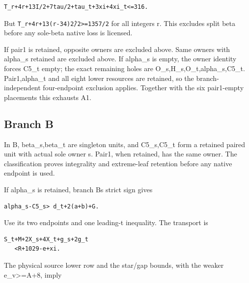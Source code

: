 \documentclass[10pt,a4paper]{article}
\theoremstyle{definition}
\begin{document}
\begin{lstlisting}
T_r+4r+13I/2+7tau/2+tau_t+3xi+4xi_t<=316.
\end{lstlisting}

But \texttt{T\_\allowbreak{}\allowbreak{}r+\allowbreak{}4r+\allowbreak{}13(r-34)\^2/\allowbreak{}2>=\allowbreak{}1357/\allowbreak{}2} for all
integers r. This excludes split beta before any sole-beta native loss is
licensed.

If pair1 is retained,\allowbreak{} opposite owners are excluded above. Same owners
with alpha\_\allowbreak{}s retained are excluded above. If alpha\_\allowbreak{}s is empty,\allowbreak{} the
owner identity forces C5\_\allowbreak{}t empty; the exact remaining holes are
O\_\allowbreak{}s,\allowbreak{}H\_\allowbreak{}s,\allowbreak{}O\_\allowbreak{}t,\allowbreak{}alpha\_\allowbreak{}s,\allowbreak{}C5\_\allowbreak{}t. Pair1,\allowbreak{}alpha\_\allowbreak{}t and all eight lower
resources are retained,\allowbreak{} so the branch-independent four-endpoint
exclusion applies. Together with the six pair1-empty placements this
exhausts A1.

\hypertarget{branch-b}{%
\subsection{Branch B}\label{branch-b}}

In B,\allowbreak{} beta\_\allowbreak{}s,\allowbreak{}beta\_\allowbreak{}t are singleton units,\allowbreak{} and C5\_\allowbreak{}s,\allowbreak{}C5\_\allowbreak{}t form a
retained paired unit with actual sole owner s. Pair1,\allowbreak{} when retained,\allowbreak{} has
the same owner. The classification proves integrality and extreme-leaf
retention before any native endpoint is used.

If alpha\_\allowbreak{}s is retained,\allowbreak{} branch B\textquotesingle s strict sign gives

\begin{lstlisting}
alpha_s-C5_s> d_t+2(a+b)+G.
\end{lstlisting}

Use its two endpoints and one leading-t inequality. The transport is

\begin{lstlisting}
S_t+M+2X_s+4X_t+g_s+2g_t
   <R+1029-e+xi.
\end{lstlisting}

The physical source lower row and the star/gap bounds,\allowbreak{} with the weaker
e\_\allowbreak{}v\textgreater=\allowbreak{}A+\allowbreak{}8,\allowbreak{} imply
\end{document}
